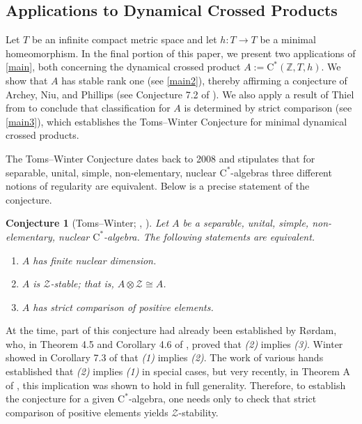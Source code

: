 \documentclass[12pt]{amsart}
\numberwithin{equation}{section}
\newtheorem{conjecture}[theorem]{Conjecture}
\theoremstyle{definition}
\theoremstyle{remark}
\begin{document}
\subsection{Applications to Dynamical Crossed Products}
\label{sc: cp}

Let $T$ be an infinite compact metric space and let $h\colon T\to T$ be a minimal homeomorphism. In the final portion of this paper, we present two applications of  \autoref{main}, both concerning the dynamical crossed product $A:=\mathrm{C^*}(\mathbb{Z},T,h)$. We show that $A$ has stable rank one (see \autoref{main2}), thereby affirming a conjecture of Archey, Niu, and Phillips (see Conjecture 7.2 of \cite{arcphil}). We also apply a result of Thiel from \cite{thi} to conclude that classification for $A$ is determined by strict comparison (see \autoref{main3}), which establishes the Toms--Winter Conjecture for minimal dynamical crossed products. 

The Toms--Winter Conjecture dates back to 2008 and stipulates that for separable, unital, simple, non-elementary, nuclear $\mathrm{C}^{*}$-algebras three different notions of regularity are equivalent. Below is a precise statement of the conjecture.

\begin{conjecture}[Toms--Winter; \cite{ET}, \cite{WZ}]
	\label{Toms-Winter}
	Let $A$ be a separable, unital, simple, non-elementary, nuclear $\mathrm{C}^{*}$-algebra. The following statements are equivalent.
	\begin{enumerate}
		\item $A$ has finite nuclear dimension.
		\item $A$ is $\mathcal{Z}$-stable; that is, $A\otimes \mathcal{Z}\cong A$.
		\item $A$ has strict comparison of positive elements. 
	\end{enumerate}
\end{conjecture}

At the time, part of this conjecture had already been established by R\o rdam, who, in Theorem 4.5 and Corollary 4.6 of \cite{Ror2}, proved that \textit{(2)} implies \textit{(3)}. Winter showed in Corollary 7.3 of \cite{Win} that \textit{(1)} implies \textit{(2)}. The work of various hands established that \textit{(2)} implies \textit{(1)} in special cases, but very recently, in Theorem A of \cite{CETWW}, this implication was shown to hold in full generality. Therefore, to establish the conjecture for a given $\mathrm{C}^{*}$-algebra, one needs only to check that strict comparison of positive elements yields $\mathcal{Z}$-stability.
\end{document}

